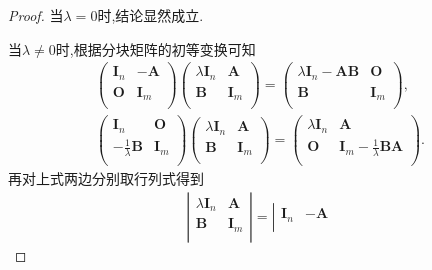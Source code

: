 \documentclass[../../main.tex]{subfiles}%
\begin{document}
\begin{proof}

当$\lambda=0$时,结论显然成立.

当$\lambda\ne 0$时,根据分块矩阵的初等变换可知
\begin{gather*}
\left( \begin{matrix}
\boldsymbol{I}_n&		-\boldsymbol{A}\\
\boldsymbol{O}&		\boldsymbol{I}_m\\
\end{matrix} \right) \left( \begin{matrix}
\lambda \boldsymbol{I}_n&		\boldsymbol{A}\\
\boldsymbol{B}&		\boldsymbol{I}_m\\
\end{matrix} \right) =\left( \begin{matrix}
\lambda \boldsymbol{I}_n-\boldsymbol{AB}&		\boldsymbol{O}\\
\boldsymbol{B}&		\boldsymbol{I}_m\\
\end{matrix} \right) ,
\\
\left( \begin{matrix}
\boldsymbol{I}_n&		\boldsymbol{O}\\
-\frac{1}{\lambda}\boldsymbol{B}&		\boldsymbol{I}_m\\
\end{matrix} \right) \left( \begin{matrix}
\lambda \boldsymbol{I}_n&		\boldsymbol{A}\\
\boldsymbol{B}&		\boldsymbol{I}_m\\
\end{matrix} \right) =\left( \begin{matrix}
\lambda \boldsymbol{I}_n&		\boldsymbol{A}\\
\boldsymbol{O}&		\boldsymbol{I}_m-\frac{1}{\lambda}\boldsymbol{BA}\\
\end{matrix} \right) .
\end{gather*}
再对上式两边分别取行列式得到
\begin{gather*}
\left| \begin{matrix}
\lambda \boldsymbol{I}_n&		\boldsymbol{A}\\
\boldsymbol{B}&		\boldsymbol{I}_m\\
\end{matrix} \right|=\left| \begin{matrix}
\boldsymbol{I}_n&		-\boldsymbol{A}\\

\end{matrix}
\end{gather*}
\end{proof}
\end{document}
